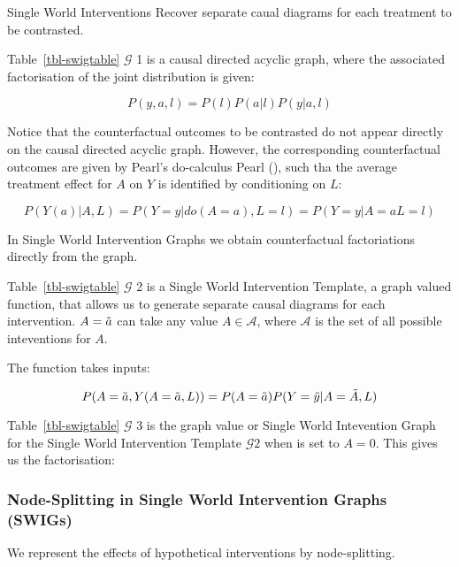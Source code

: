 \documentclass[
  single column]{article}
\begin{document}
\begin{table}

\caption{\label{tbl-swigtable}Single World Interventions Recover
separate caual diagrams for each treatment to be contrasted.}

\centering{

\swigtable

}

\end{table}%

Table~\ref{tbl-swigtable} \(\mathcal{G}\) 1 is a causal directed acyclic
graph, where the associated factorisation of the joint distribution is
given:

\[
P(y, a, l) = P(l) P(a | l) P(y | a, l)
\]

Notice that the counterfactual outcomes to be contrasted do not appear
directly on the causal directed acyclic graph. However, the
corresponding counterfactual outcomes are given by Pearl's do-calculus
Pearl (), such tha the average treatment
effect for \(A\) on \(Y\) is identified by conditioning on \(L\):

\[
P(Y(a)|A,L) = P(Y = y|do(A =a), L=l) = P(Y=y|A=a L=l)
\]

In Single World Intervention Graphs we obtain counterfactual
factoriations directly from the graph.

Table~\ref{tbl-swigtable} \(\mathcal{G}\) 2 is a Single World
Intervention Template, a graph valued function, that allows us to
generate separate causal diagrams for each intervention.
\(A = \Tilde{a}\) can take any value \(A \in \mathcal{A}\), where
\(\mathcal{A}\) is the set of all possible inteventions for \(A\).

The function takes inputs:

\[
P(A = \Tilde{a}, Y(A = \Tilde{a}, L))  = P(A = \Tilde{a})P(Y = \Tilde{y}|A = \Tilde{A}, L)
\]

Table~\ref{tbl-swigtable} \(\mathcal{G}\) 3 is the graph value or Single
World Intevention Graph for the Single World Intervention Template
\(\mathcal{G} 2\) when is set to \(A =0\). This gives us the
factorisation:

\subsubsection{Node-Splitting in Single World Intervention Graphs
(SWIGs)}\label{node-splitting-in-single-world-intervention-graphs-swigs}

We represent the effects of hypothetical interventions by
node-splitting.
\end{document}
